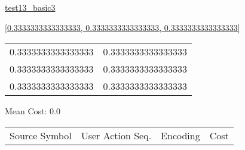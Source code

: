 \documentclass[12pt]{article}
\begin{document}
\noindent \url{test13_basic3}

\noindent \url{[0.3333333333333333, 0.3333333333333333, 0.3333333333333333]}

\noindent\begin{tt}
\begin{small}
\begin{bundle}{}
\end{bundle}
\end{small}
\end{tt}
\newpage%
\begin{tabular}{l l}0.3333333333333333	&	0.3333333333333333\\
0.3333333333333333	&	0.3333333333333333\\
0.3333333333333333	&	0.3333333333333333\\
\end{tabular}\newpage
\noindent
\noindent Mean Cost: 0.0\\
\begin{tabular}{l l l l}
Source Symbol	&	User Action Seq.	&	Encoding	&	Cost\\
\end{tabular}
\end{document}
